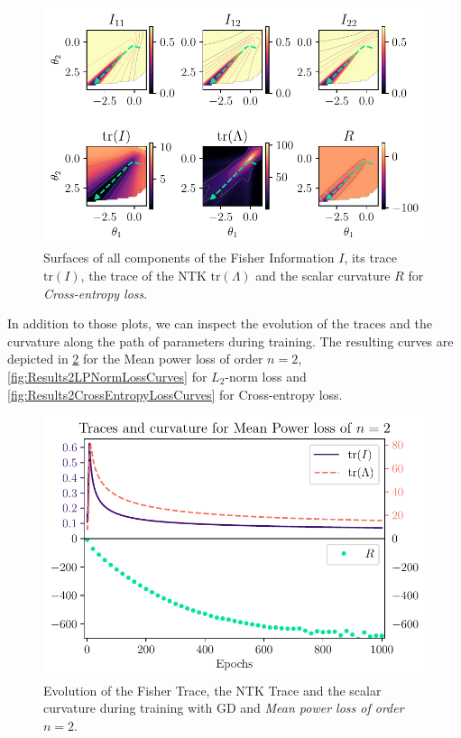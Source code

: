 \begin{figure}
	\centering
	\includegraphics{Experiment2/plots/CrossEntropyLoss_tracecomparison.pdf}
	\caption{Surfaces of all components of the Fisher Information $I$, its trace $\mathrm{tr}(I)$, the trace of the NTK $\mathrm{tr}(\Lambda)$ and the scalar curvature $R$ for \emph{Cross-entropy loss}.}
	\label{fig:Results2CrossEntropyLoss}
\end{figure}
In addition to those plots, we can inspect the evolution of the traces and the curvature along the path of parameters during training. The resulting curves are depicted in \cref{fig:Results2MeanPowerLossCurves} for the Mean power loss of order $n=2$, \cref{fig:Results2LPNormLossCurves} for $L_2$-norm loss and \cref{fig:Results2CrossEntropyLossCurves} for Cross-entropy loss.\\
\begin{figure}
	\centering
	\includegraphics{Experiment2/plots/MeanPowerLoss2_Curves.pdf}
	\caption{Evolution of the Fisher Trace, the NTK Trace and the scalar curvature during training with GD and \emph{Mean power loss of order $n=2$}.}
	\label{fig:Results2MeanPowerLossCurves}
\end{figure}

